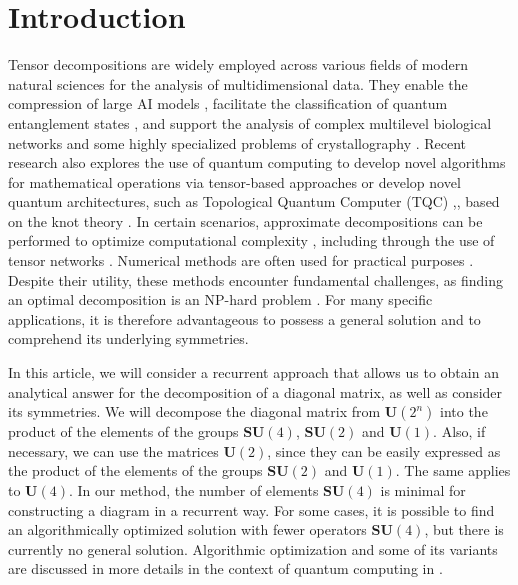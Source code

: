 \documentclass[a4paper, openany, 12pt]{article}
\theoremstyle{remark}
\theoremstyle{definition}
\begin{document}
    \tableofcontents{}
    \newpage

\section{Introduction \label{sec:phys}}

Tensor decompositions are widely employed across various fields of modern natural sciences for the analysis of multidimensional data. They enable the compression of large AI models \cite{Liu_2023}, facilitate the classification of quantum entanglement states \cite{doi:10.1137/24M1643451}, and support the analysis of complex multilevel biological networks \cite{doi:10.1137/23M1592547} and some highly specialized problems of crystallography \cite{aroyo2006bilbao}. Recent research also explores the use of quantum computing to develop novel algorithms for mathematical operations via tensor-based approaches \cite{Uotila_2024} or develop novel quantum architectures, such as Topological Quantum Computer (TQC) \cite{KITAEV20032},\cite{KOLGANOV2023116072},\cite{Kolganov2020} based on the knot theory \cite{BISHLER2023104729}. In certain scenarios, approximate decompositions can be performed to optimize computational complexity \cite{Schollw_ck_2011}, including through the use of tensor networks \cite{TYRTYSHNIKOV2004423}. Numerical methods are often used for practical purposes \cite{doi:10.1137/090752286}. Despite their utility, these methods encounter fundamental challenges, as finding an optimal decomposition is an NP-hard problem \cite{turchetti2023decompositionlineartensortransformations}.  For many specific applications, it is therefore advantageous to possess a general solution and to comprehend its underlying symmetries.

In this article, we will consider a recurrent approach that allows us to obtain an analytical answer for the decomposition of a diagonal matrix, as well as consider its symmetries. We will decompose the diagonal matrix from $\mathbf{U}(2^n)$ into the product of the elements of the groups $\mathbf{SU}(4)$, $\mathbf{SU}(2)$ and $\mathbf{U}(1)$.
Also, if necessary, we can use the matrices $\mathbf{U}(2)$, since they can be easily expressed as the product of the elements of the groups $\mathbf{SU}(2)$ and $\mathbf{U}(1)$. The same applies to $\mathbf{U}(4)$. In our method, the number of elements $\mathbf{SU}(4)$ is minimal for constructing a diagram in a recurrent way. For some cases, it is possible to find an algorithmically optimized solution with fewer operators $\mathbf{SU}(4)$, but there is currently no general solution. Algorithmic optimization and some of its variants are discussed in more details in the context of quantum computing in \cite{huang2024optimizedsynthesiscircuitsdiagonal}.
\end{document}
